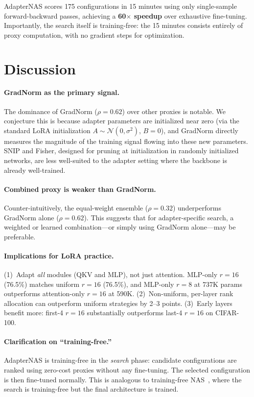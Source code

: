 \documentclass[10pt,twocolumn,letterpaper]{article}
\newcommand{\method}{AdapterNAS\xspace}
\begin{document}
\method scores 175 configurations in 15 minutes using only single-sample forward-backward passes, achieving a \textbf{60$\times$ speedup} over exhaustive fine-tuning. Importantly, the search itself is training-free: the 15 minutes consists entirely of proxy computation, with no gradient steps for optimization.

\section{Discussion}
\label{sec:discussion}

\paragraph{GradNorm as the primary signal.}
The dominance of GradNorm ($\rho = 0.62$) over other proxies is notable. We conjecture this is because adapter parameters are initialized near zero (via the standard LoRA initialization $A \sim \mathcal{N}(0, \sigma^2)$, $B = 0$), and GradNorm directly measures the magnitude of the training signal flowing into these new parameters. SNIP and Fisher, designed for pruning at initialization in randomly initialized networks, are less well-suited to the adapter setting where the backbone is already well-trained.

\paragraph{Combined proxy is weaker than GradNorm.}
Counter-intuitively, the equal-weight ensemble ($\rho = 0.32$) underperforms GradNorm alone ($\rho = 0.62$). This suggests that for adapter-specific search, a weighted or learned combination---or simply using GradNorm alone---may be preferable.

\paragraph{Implications for LoRA practice.}
(1)~Adapt \emph{all} modules (QKV and MLP), not just attention. MLP-only $r{=}16$ (76.5\%) matches uniform $r{=}16$ (76.5\%), and MLP-only $r{=}8$ at 737K params outperforms attention-only $r{=}16$ at 590K.
(2)~Non-uniform, per-layer rank allocation can outperform uniform strategies by 2--3 points.
(3)~Early layers benefit more: first-4 $r{=}16$ substantially outperforms last-4 $r{=}16$ on CIFAR-100.

\paragraph{Clarification on ``training-free.''}
\method is training-free in the \emph{search} phase: candidate configurations are ranked using zero-cost proxies without any fine-tuning. The selected configuration is then fine-tuned normally. This is analogous to training-free NAS~\cite{abdelfattah2021zerocost}, where the search is training-free but the final architecture is trained.
\end{document}
